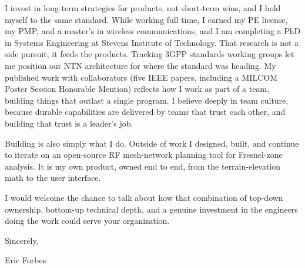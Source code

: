 \documentclass[10pt, letterpaper]{article}
\newcommand{\company}{your organization}
\begin{document}
I invest in long-term strategies for products, not short-term wins, and I hold myself to the same
standard. While working full time, I earned my PE license, my PMP, and a master's in wireless
communications, and I am completing a PhD in Systems Engineering at Stevens Institute of
Technology. That research is not a side pursuit; it feeds the products. Tracking 3GPP standards
working groups let me position our NTN architecture for where the standard was heading. My
published work with collaborators (five IEEE papers, including a MILCOM Poster Session Honorable
Mention) reflects how I work as part of a team, building things that outlast a single program. I
believe deeply in team culture, because durable capabilities are delivered by teams that trust
each other, and building that trust is a leader's job.

Building is also simply what I do. Outside of work I designed, built, and continue to iterate on
an open-source RF mesh-network planning tool for Fresnel-zone analysis. It is my own product,
owned end to end, from the terrain-elevation math to the user interface.

I would welcome the chance to talk about how that combination of top-down ownership, bottom-up
technical depth, and a genuine investment in the engineers doing the work could serve \company{}.

\vspace{2pt}
Sincerely,

Eric Forbes
\end{document}
